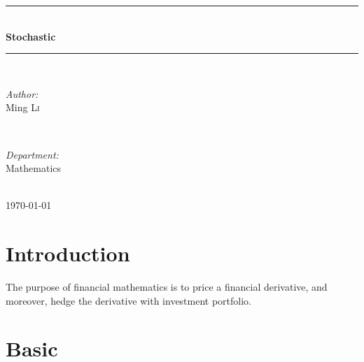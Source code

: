 \documentclass[UTF8]{article} %
\begin{document}

\begin{titlepage}

\newcommand{\HRule}{\rule{\linewidth}{0.5mm}} %

\center %

\HRule \\[0.4cm]
{ \huge \bfseries Stochastic}\\[0.4cm] %
\HRule \\[1.5cm]

\begin{minipage}{0.4\textwidth}
\begin{flushleft} \large
\emph{Author:}\\
Ming \textsc{Li} %
\end{flushleft}
\end{minipage}
~
\begin{minipage}{0.4\textwidth}
\begin{flushright} \large
\emph{Department:} \\
Mathematics
\end{flushright}
\end{minipage}\\[4cm]

{\large \today}\\[3cm] %


\vfill %
\end{titlepage}
\newpage
\section{Introduction}
The purpose of financial mathematics is to price a financial derivative, and moreover, hedge the derivative with investment portfolio.

\section{Basic}
\end{document}
